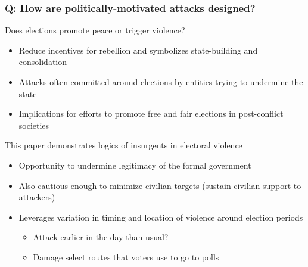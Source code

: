 \documentclass[aspectratio=169]{beamer}
\begin{document}
\begin{frame}
\frametitle{Q: How are politically-motivated attacks designed?} 
Does elections promote peace or trigger violence?
\begin{itemize}\setlength\itemsep{3pt}
\item Reduce incentives for rebellion and symbolizes state-building and consolidation
  \item Attacks often committed around elections by entities trying to undermine the state
\item Implications for efforts to promote free and fair elections in post-conflict societies
\end{itemize}\medskip
This paper demonstrates logics of insurgents in electoral violence
\begin{itemize}\setlength\itemsep{3pt}
\item Opportunity to undermine legitimacy of the formal government
\item Also cautious enough to minimize civilian targets (sustain civilian support to attackers)
\item Leverages variation in timing and location of violence around election periods
\begin{itemize}\setlength\itemsep{3pt}
  \item Attack earlier in the day than usual?
  \item Damage select routes that voters use to go to polls
\end{itemize}
\end{itemize}
\end{frame}
\end{document}
